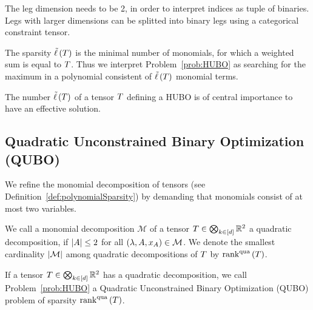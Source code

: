 The leg dimension needs to be 2, in order to interpret indices as tuple of binaries.
Legs with larger dimensions can be splitted into binary legs using a categorical constraint tensor.


% 
The sparsity $\tilde{\ell} \left(T\right)$ is the minimal number of monomials, for which a weighted sum is equal to $T$.
Thus we interpret Problem~\ref{prob:HUBO} as searching for the maximum in a polynomial consistent of $\tilde{\ell} \left(T\right)$ monomial terms.


\begin{remark}[Sparsity]%

The number $\tilde{\ell} \left(T\right)$ of a tensor $T$ defining a HUBO is of central importance to have an effective solution.


\end{remark}




\subsection{Quadratic Unconstrained Binary Optimization (QUBO)}

We refine the monomial decomposition of tensors (see Definition~\ref{def:polynomialSparsity}) by demanding that monomials consist of at most two variables.

\begin{definition}
	We call a monomial decomposition $\mathcal{M}$ of a tensor $T\in\bigotimes_{k\in[d]}\mathbb{R}^2$ a quadratic decomposition, if $\left|A\right|\leq 2$ for all $(\lambda,A,x_{A}) \in \mathcal{M}$.
	We denote the smallest cardinality $\left|\mathcal{M}\right|$ among quadratic decompositions of $T$ by $\mathrm{rank}^{\mathrm{qua}}\left(T\right)$.

	If a tensor $T\in\bigotimes_{k\in[d]}\mathbb{R}^2$ has a quadratic decomposition, we call Problem~\ref{prob:HUBO} a Quadratic Unconstrained Binary Optimization (QUBO) problem of sparsity $\mathrm{rank}^{\mathrm{qua}}\left(T\right)$.
\end{definition}


